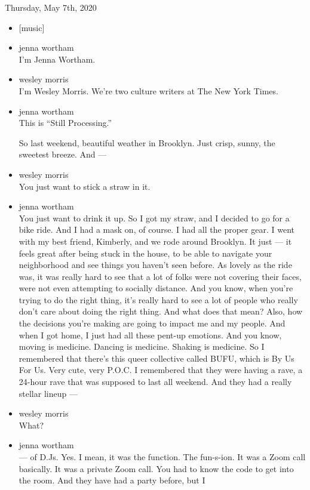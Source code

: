 Thursday, May 7th, 2020

\begin{itemize}
\item
  {[}music{]}
\item
  jenna wortham\\
  I'm Jenna Wortham.
\item
  wesley morris\\
  I'm Wesley Morris. We're two culture writers at The New York Times.
\item
  jenna wortham\\
  This is ``Still Processing.''

  So last weekend, beautiful weather in Brooklyn. Just crisp, sunny, the
  sweetest breeze. And ---
\item
  wesley morris\\
  You just want to stick a straw in it.
\item
  jenna wortham\\
  You just want to drink it up. So I got my straw, and I decided to go
  for a bike ride. And I had a mask on, of course. I had all the proper
  gear. I went with my best friend, Kimberly, and we rode around
  Brooklyn. It just --- it feels great after being stuck in the house,
  to be able to navigate your neighborhood and see things you haven't
  seen before. As lovely as the ride was, it was really hard to see that
  a lot of folks were not covering their faces, were not even attempting
  to socially distance. And you know, when you're trying to do the right
  thing, it's really hard to see a lot of people who really don't care
  about doing the right thing. And what does that mean? Also, how the
  decisions you're making are going to impact me and my people. And when
  I got home, I just had all these pent-up emotions. And you know,
  moving is medicine. Dancing is medicine. Shaking is medicine. So I
  remembered that there's this queer collective called BUFU, which is By
  Us For Us. Very cute, very P.O.C. I remembered that they were having a
  rave, a 24-hour rave that was supposed to last all weekend. And they
  had a really stellar lineup ---
\item
  wesley morris\\
  What?
\item
  jenna wortham\\
  --- of D.Js. Yes. I mean, it was the function. The fun-s-ion. It was a
  Zoom call basically. It was a private Zoom call. You had to know the
  code to get into the room. And they have had a party before, but I

\end{itemize}
